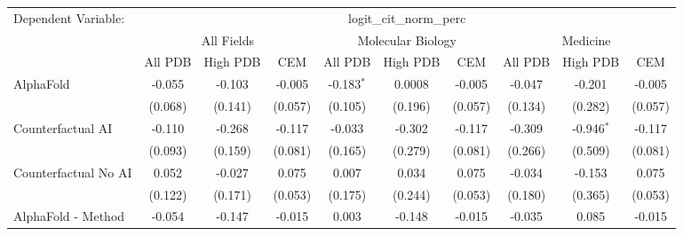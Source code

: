 \begingroup
\centering
\begin{tabular}{lccccccccc}
   \tabularnewline \midrule \midrule
   Dependent Variable: & \multicolumn{9}{c}{logit\_cit\_norm\_perc}\\
 & \multicolumn{3}{c}{All Fields} & \multicolumn{3}{c}{Molecular Biology} & \multicolumn{3}{c}{Medicine} \\
\cmidrule(lr){2-7} \cmidrule(lr){5-10} \cmidrule(lr){8-7}
 & \multicolumn{1}{c}{All PDB} & \multicolumn{1}{c}{High PDB} & \multicolumn{1}{c}{CEM} & \multicolumn{1}{c}{All PDB} & \multicolumn{1}{c}{High PDB} & \multicolumn{1}{c}{CEM} & \multicolumn{1}{c}{All PDB} & \multicolumn{1}{c}{High PDB} & \multicolumn{1}{c}{CEM} \\
\cmidrule(lr){2-3} \cmidrule(lr){3-4} \cmidrule(lr){4-5} \cmidrule(lr){5-6} \cmidrule(lr){6-7} \cmidrule(lr){7-8} \cmidrule(lr){8-9} \cmidrule(lr){9-10} \cmidrule(lr){10-3}
   AlphaFold                                                   & -0.055         & -0.103         & -0.005        & -0.183$^{*}$   & 0.0008         & -0.005        & -0.047         & -0.201         & -0.005\\   
                                                               & (0.068)        & (0.141)        & (0.057)       & (0.105)        & (0.196)        & (0.057)       & (0.134)        & (0.282)        & (0.057)\\   
   Counterfactual AI                                           & -0.110         & -0.268         & -0.117        & -0.033         & -0.302         & -0.117        & -0.309         & -0.946$^{*}$   & -0.117\\   
                                                               & (0.093)        & (0.159)        & (0.081)       & (0.165)        & (0.279)        & (0.081)       & (0.266)        & (0.509)        & (0.081)\\   
   Counterfactual No AI                                        & 0.052          & -0.027         & 0.075         & 0.007          & 0.034          & 0.075         & -0.034         & -0.153         & 0.075\\   
                                                               & (0.122)        & (0.171)        & (0.053)       & (0.175)        & (0.244)        & (0.053)       & (0.180)        & (0.365)        & (0.053)\\   
   AlphaFold - Method                                          & -0.054         & -0.147         & -0.015        & 0.003          & -0.148         & -0.015        & -0.035         & 0.085          & -0.015\\   

\end{tabular}
